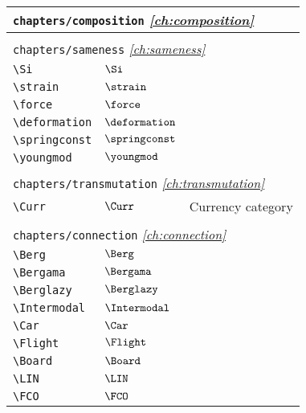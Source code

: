 \begin{longtable}{lll}
 \multicolumn{3}{l}{{\color[rgb]{0.5,0.5,0.5}\texttt{chapters/composition}} \emph{\cref{ch:composition}}}\\ 
 \hline
 &  & \\ 
 \multicolumn{3}{l}{{\color[rgb]{0.5,0.5,0.5}\texttt{chapters/sameness}} \emph{\cref{ch:sameness}}}\\ 
 \hline
{\color[rgb]{0.5,0.5,0.5}\texttt{\textbackslash Si}} & $\Si$ & \\ 
 {\color[rgb]{0.5,0.5,0.5}\texttt{\textbackslash strain}} & $\strain$ & \\ 
 {\color[rgb]{0.5,0.5,0.5}\texttt{\textbackslash force}} & $\force$ & \\ 
 {\color[rgb]{0.5,0.5,0.5}\texttt{\textbackslash deformation}} & $\deformation$ & \\ 
 {\color[rgb]{0.5,0.5,0.5}\texttt{\textbackslash springconst}} & $\springconst$ & \\ 
 {\color[rgb]{0.5,0.5,0.5}\texttt{\textbackslash youngmod}} & $\youngmod$ & \\ 
  &  & \\ 
 \multicolumn{3}{l}{{\color[rgb]{0.5,0.5,0.5}\texttt{chapters/transmutation}} \emph{\cref{ch:transmutation}}}\\ 
 \hline
{\color[rgb]{0.5,0.5,0.5}\texttt{\textbackslash Curr}} & $\Curr$ &  Currency category\\ 
  &  & \\ 
 \multicolumn{3}{l}{{\color[rgb]{0.5,0.5,0.5}\texttt{chapters/connection}} \emph{\cref{ch:connection}}}\\ 
 \hline
{\color[rgb]{0.5,0.5,0.5}\texttt{\textbackslash Berg}} & $\Berg$ & \\ 
 {\color[rgb]{0.5,0.5,0.5}\texttt{\textbackslash Bergama}} & $\Bergama$ & \\ 
 {\color[rgb]{0.5,0.5,0.5}\texttt{\textbackslash Berglazy}} & $\Berglazy$ & \\ 
 {\color[rgb]{0.5,0.5,0.5}\texttt{\textbackslash Intermodal}} & $\Intermodal$ & \\ 
 {\color[rgb]{0.5,0.5,0.5}\texttt{\textbackslash Car}} & $\Car$ & \\ 
 {\color[rgb]{0.5,0.5,0.5}\texttt{\textbackslash Flight}} & $\Flight$ & \\ 
 {\color[rgb]{0.5,0.5,0.5}\texttt{\textbackslash Board}} & $\Board$ & \\ 
 {\color[rgb]{0.5,0.5,0.5}\texttt{\textbackslash LIN}} & $\LIN$ & \\ 
 {\color[rgb]{0.5,0.5,0.5}\texttt{\textbackslash FCO}} & $\FCO$ & \\ 

\end{longtable}
